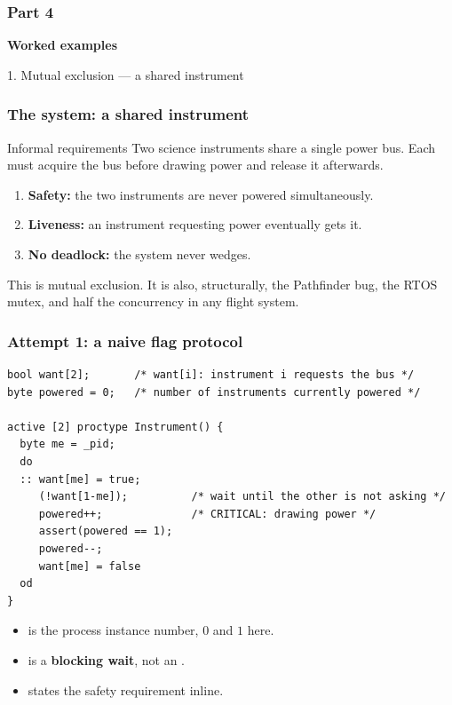 \begin{frame}
  \frametitle{Part 4}

{\Large\bf Worked examples}

\vspace{0.5cm}

{\large 1. Mutual exclusion --- a shared instrument}

\end{frame}

\begin{frame}
  \frametitle{The system: a shared instrument} \small

\begin{block}{Informal requirements}\small
Two science instruments share a single power bus. Each must acquire the bus
before drawing power and release it afterwards.

\begin{enumerate}
\item {\bf Safety:} the two instruments are never powered simultaneously.
\item {\bf Liveness:} an instrument requesting power eventually gets it.
\item {\bf No deadlock:} the system never wedges.
\end{enumerate}
\end{block}

\pause
\vspace{0.3cm}

This is mutual exclusion. It is also, structurally, the Pathfinder bug,
the RTOS mutex, and half the concurrency in any flight system.

\end{frame}

\begin{frame}[fragile]
  \frametitle{Attempt 1: a naive flag protocol} \small

\begin{lstlisting}[language=promela]
bool want[2];       /* want[i]: instrument i requests the bus */
byte powered = 0;   /* number of instruments currently powered */

active [2] proctype Instrument() {
  byte me = _pid;
  do
  :: want[me] = true;
     (!want[1-me]);          /* wait until the other is not asking */
     powered++;              /* CRITICAL: drawing power */
     assert(powered == 1);
     powered--;
     want[me] = false
  od
}
\end{lstlisting}

\pause

\begin{itemize}
\item {} is the process instance number, $0$ and $1$ here.
\item {} is a {\bf blocking wait}, not an .
\item {} states the safety requirement inline.
\end{itemize}

\end{frame}

